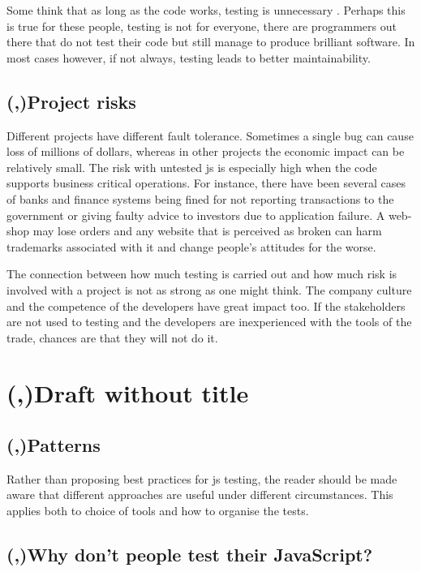 \documentclass[11pt]{article}
\begin{document}
Some think that as long as the code works, testing is unnecessary \cite[question~13]{Ahnve}. Perhaps this is true for these people, testing is not for everyone, there are programmers out there that do not test their code but still manage to produce brilliant software. In most cases however, if not always, testing leads to better maintainability. \cite[question~33]{Ahnve}

\subsection{(,)Project risks}
\label{subsec:projectrisks}

Different projects have different fault tolerance. Sometimes a single bug can cause loss of millions of dollars, whereas in other projects the economic impact can be relatively small. The risk with untested \gls{js} is especially high when the code supports business critical operations. For instance, there have been several cases of banks and finance systems being fined for not reporting transactions to the government \cite{Bug1} or giving faulty advice to investors \cite{Bug2} due to application failure. A web-shop may lose orders and any website that is perceived as broken can harm trademarks associated with it and change people's attitudes for the worse.

The connection between how much testing is carried out and how much risk is involved with a project is not as strong as one might think. The company culture and the competence of the developers have great impact too. If the stakeholders are not used to testing and the developers are inexperienced with the tools of the trade, chances are that they will not do it. \cite[question~14]{Ahnve}


\section{(,)Draft without title}

\subsection{(,)Patterns}

Rather than proposing best practices for \gls{js} testing, the reader should be made aware that different approaches are useful under different circumstances. This applies both to choice of tools and how to organise the tests.

\subsection{(,)Why don't people test their JavaScript?}
\end{document}
